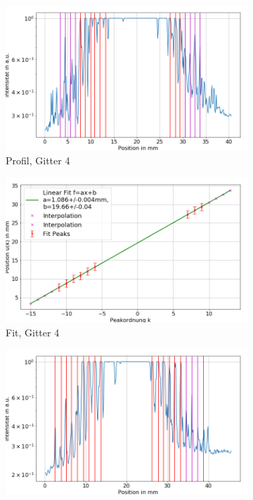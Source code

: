 \documentclass[
	a4paper,
	12pt,
	pagesize,
	ngerman
]{scrartcl}
\begin{document}
	\begin{figure}[H]
        \centering
				\begin{subfigure}[b]{0.475\textwidth}
            \centering
            \includegraphics[width=\textwidth]{img/3/3_trafo_g4}
            \caption%
            {Profil, Gitter 4}
            \label{fig_3_profil_g4}
        \end{subfigure}
        \hfill
        \begin{subfigure}[b]{0.475\textwidth}
            \centering
            \includegraphics[width=\textwidth]{img/3/3_trafo_g4_fit}
            \caption[]%
            {Fit, Gitter 4}
            \label{fig_3_fit_g4}
        \end{subfigure}
        \begin{subfigure}[b]{0.475\textwidth}
            \centering
            \includegraphics[width=\textwidth]{img/3/3_trafo_g5}

\end{subfigure}
\end{figure}
\end{document}
